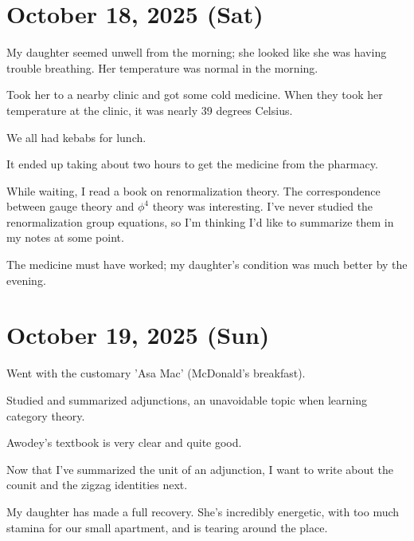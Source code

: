 \documentclass[uplatex]{jsarticle}
\begin{document}
\section{October 18, 2025 (Sat)}

My daughter seemed unwell from the morning; she looked like she was having trouble breathing.
Her temperature was normal in the morning.

Took her to a nearby clinic and got some cold medicine.
When they took her temperature at the clinic, it was nearly 39 degrees Celsius.

We all had kebabs for lunch.

It ended up taking about two hours to get the medicine from the pharmacy.

While waiting, I read a book on renormalization theory.
The correspondence between gauge theory and $\phi^4$ theory was interesting.
I've never studied the renormalization group equations, so I'm thinking I'd like to summarize them in my notes at some point.

The medicine must have worked; my daughter's condition was much better by the evening.

\section{October 19, 2025 (Sun)}

Went with the customary 'Asa Mac' (McDonald's breakfast).

Studied and summarized adjunctions, an unavoidable topic when learning category theory.

Awodey's textbook is very clear and quite good.

Now that I've summarized the unit of an adjunction, I want to write about the counit and the zigzag identities next.

My daughter has made a full recovery. She's incredibly energetic, with too much stamina for our small apartment, and is tearing around the place.
\end{document}
